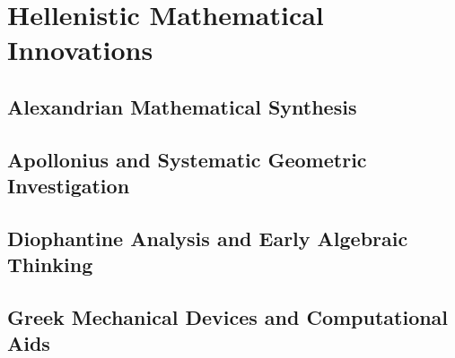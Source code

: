 

\chapter{Hellenistic Mathematical Innovations}

\section{Alexandrian Mathematical Synthesis}

\section{Apollonius and Systematic Geometric Investigation}

\section{Diophantine Analysis and Early Algebraic Thinking}

\section{Greek Mechanical Devices and Computational Aids}

